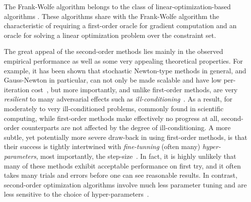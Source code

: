 The Frank-Wolfe algorithm belongs to the class of linear-optimization-based
algorithms \cite{lan2016conditional,lan2017conditional}.
These algorithms share with the Frank-Wolfe algorithm the characteristic of
requiring a first-order oracle for gradient computation and an oracle for
solving a linear optimization problem over the constraint set.

\medskip{}
The great appeal of the second-order methods lies mainly in the observed empirical performance as well as some very appealing theoretical properties. For example, it has been shown that stochastic Newton-type methods in general, and Gauss-Newton in particular, can not only be made scalable and have low per-iteration cost~\cite{rodoas1,rodoas2,roszas,haber2000optimization,haber2012effective,doas12}, but more importantly, and unlike first-order methods, are very \emph{resilient} to many adversarial effects such as \emph{ill-conditioning}~\cite{romassn1,romassn2,pyrrm_ssn_nonuni}. As a result, for moderately to very ill-conditioned problems, commonly found in scientific computing, while first-order methods make effectively no progress at all, second-order counterparts are not affected by the degree of ill-conditioning. 
A more subtle, yet potentially more severe draw-back in using first-order methods, is that their success is tightly intertwined with \emph{fine-tunning} (often many) \emph{hyper-parameters}, most importantly, the step-size~\cite{berahas2017investigation}. In fact, it is highly unlikely that many of these methods exhibit acceptable performance on first try, and it often takes many trials and errors before one can see reasonable results. In contrast, second-order optimization algorithms involve much less parameter tuning and are less sensitive to the choice of hyper-parameters~\cite{berahas2017investigation, xu2017second}. 

